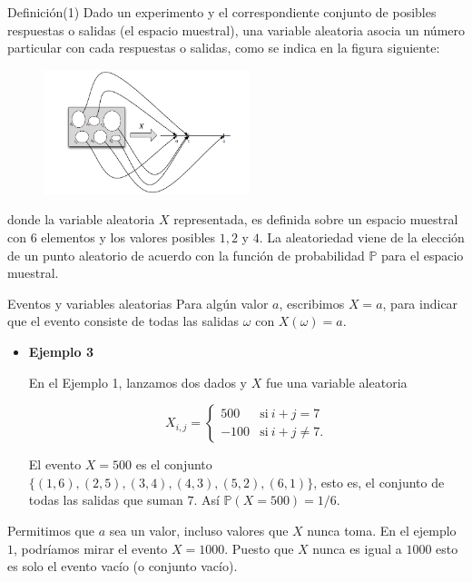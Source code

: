 \documentclass[10pt]{beamer}
\begin{document}
\begin{frame}{Definici\'on(1) }
\small{Dado un experimento y el correspondiente conjunto de posibles respuestas o salidas (el espacio muestral), una variable aleatoria asocia un n\'umero particular con cada respuestas o salidas, como se indica en la figura siguiente:} 


\vspace{0.2cm}


\begin{figure}[ht]
	\centering
	\includegraphics[width=6cm]{v1}
\end{figure}

\small{donde la variable aleatoria $X$ representada, es definida sobre un espacio muestral con $6$ elementos y los valores posibles $1, 2$ y $4$. La aleatoriedad viene de la elecci\'on de un punto  aleatorio de acuerdo con la funci\'on de probabilidad $\mathbb{P}$ para el espacio muestral.}
\end{frame}

\begin{frame}{Eventos y variables aleatorias }
Para alg\'un valor $a$, escribimos $X = a$, para indicar que el evento  consiste de todas las salidas $\omega$ con $X(\omega) = a$.

\begin{itemize}
\item \small {\textbf{Ejemplo 3} 
	
En el Ejemplo 1, lanzamos dos dados y $X$ fue una variable aleatoria

\[
X_{i,j} = \begin{cases}
500 & \text{si}\ i + j = 7\\
-100 & \text{si}\ i + j \neq 7.
\end{cases}
\]

El evento $X = 500$ es el conjunto $\{(1,6), (2,5), (3,4), (4,3), (5,2), (6,1) \}$, esto es, el conjunto de todas las salidas que suman $7$. As\'i $\mathbb{P}(X = 500) = 1/6$.
}
\end{itemize}

\vspace{0.2cm}

\scriptsize{Permitimos que $a$ sea un valor, incluso valores que $X$ nunca toma. En el ejemplo $1$, podr\'iamos mirar el evento $X = 1000$. Puesto que $X$ nunca es igual a $1000$ esto es solo el evento vac\'io (o conjunto vac\'io). }
\end{frame}
\end{document}
